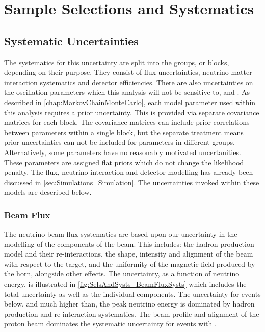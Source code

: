 \chapter{Sample Selections and Systematics}
\label{chap:SelsAndSysts}

\section{Systematic Uncertainties}
\label{sec:SelsAndSysts_Systs}

The systematics for this uncertainty are split into the groups, or blocks, depending on their purpose. They consist of flux uncertainties, neutrino-matter interaction systematics and detector efficiencies. There are also uncertainties on the oscillation parameters which this analysis will not be sensitive to, \delmsqsol and \sinsqsol. As described in \autoref{chap:MarkovChainMonteCarlo}, each model parameter used within this analysis requires a prior uncertainty. This is provided via separate covariance matrices for each block. The covariance matrices can include prior correlations between parameters within a single block, but the separate treatment means prior uncertainties can not be included for parameters in different groups. Alternatively, some parameters have no reasonably motivated uncertanities. These parameters are assigned flat priors which do not change the likelihood penalty. The flux, neutrino interaction and detector modelling has already been discussed in \autoref{sec:Simulations_Simulation}. The uncertainties invoked within these models are described below.

\subsection{Beam Flux}
\label{sec:SelsAndSysts_Systs_BeamFlux}

The neutrino beam flux systematics are based upon our uncertainty in the modelling of the components of the beam. This includes: the hadron production model and their re-interactions, the shape, intensity and alignment of the beam with respect to the target, and the uniformity of the magnetic field produced by the horn, alongside other effects. The uncertainty, as a function of neutrino energy, is illustrated in \autoref{fig:SelsAndSysts_BeamFluxSysts} which includes the total uncertainty as well as the individual components. The uncertainty for events below, and much higher than, the peak neutrino energy is dominated by hadron production and re-interaction systematics. The beam profile and alignment of the proton beam dominates the systematic uncertainty for events with . 

